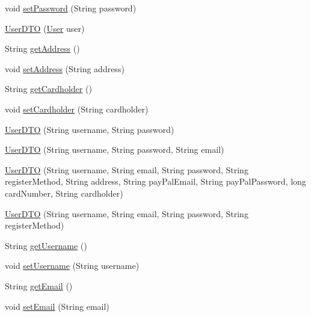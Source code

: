 \begin{DoxyCompactItemize}
void \mbox{\hyperlink{class_s_p_q_1_1dto_1_1_user_d_t_o_a35bd2d50e194e3d923e8adcf229e5a3e}{set\+Password}} (String password)
\item 
\mbox{\hyperlink{class_s_p_q_1_1dto_1_1_user_d_t_o_a40cad7b1dea2117ed4cb0e69fdc6b929}{User\+D\+TO}} (\mbox{\hyperlink{class_s_p_q_1_1data_1_1_user}{User}} user)
\item 
String \mbox{\hyperlink{class_s_p_q_1_1dto_1_1_user_d_t_o_a5234f9e12bcda79c32c4aec80de40ad2}{get\+Address}} ()
\item 
void \mbox{\hyperlink{class_s_p_q_1_1dto_1_1_user_d_t_o_a9ea48b87767eb765aac4f10d0cb9d53a}{set\+Address}} (String address)
\item 
String \mbox{\hyperlink{class_s_p_q_1_1dto_1_1_user_d_t_o_a82fe9a242f18d3cb62735cee648e71d9}{get\+Cardholder}} ()
\item 
void \mbox{\hyperlink{class_s_p_q_1_1dto_1_1_user_d_t_o_a3627efce4d0873f1e706e8ad65a28506}{set\+Cardholder}} (String cardholder)
\item 
\mbox{\hyperlink{class_s_p_q_1_1dto_1_1_user_d_t_o_ad73df6daa2dd8fc4615a5b154acc229b}{User\+D\+TO}} (String username, String password)
\item 
\mbox{\hyperlink{class_s_p_q_1_1dto_1_1_user_d_t_o_ad7df1249da1b9fdc0b383a4b96b50eae}{User\+D\+TO}} (String username, String password, String email)
\item 
\mbox{\hyperlink{class_s_p_q_1_1dto_1_1_user_d_t_o_ad9a6a079da473fe91114b91f0383196f}{User\+D\+TO}} (String username, String email, String password, String register\+Method, String address, String pay\+Pal\+Email, String pay\+Pal\+Password, long card\+Number, String cardholder)
\item 
\mbox{\hyperlink{class_s_p_q_1_1dto_1_1_user_d_t_o_a96eac4c18d86e06c5fd796e69322e5fb}{User\+D\+TO}} (String username, String email, String password, String register\+Method)
\item 
String \mbox{\hyperlink{class_s_p_q_1_1dto_1_1_user_d_t_o_a0cd335456c4f53b97069820475742980}{get\+Username}} ()
\item 
void \mbox{\hyperlink{class_s_p_q_1_1dto_1_1_user_d_t_o_a53003074966a77e89f5900344ab79b15}{set\+Username}} (String username)
\item 
String \mbox{\hyperlink{class_s_p_q_1_1dto_1_1_user_d_t_o_a67038ab8bab7cb7119ece00bcb20a360}{get\+Email}} ()
\item 
void \mbox{\hyperlink{class_s_p_q_1_1dto_1_1_user_d_t_o_a3e41397e229b7f0398232747d97d6d5e}{set\+Email}} (String email)
\item 

\end{DoxyCompactItemize}
